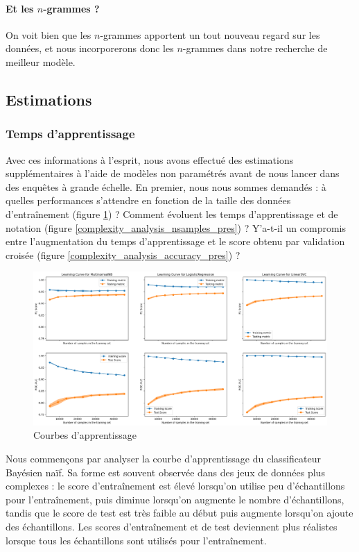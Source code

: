 \documentclass{article}
\begin{document}
\paragraph{Et les $n$-grammes ?}

On voit bien que les $n$-grammes apportent un tout nouveau regard sur les données, et nous incorporerons donc les $n$-grammes dans notre recherche de meilleur modèle.

\subsection{Estimations}

\subsubsection{Temps d'apprentissage}
Avec ces informations à l'esprit, nous avons effectué des estimations supplémentaires à l'aide de modèles non paramétrés avant de nous lancer dans des enquêtes à grande échelle. En premier, nous nous sommes demandés : à quelles performances s'attendre en fonction de la taille des données d'entraînement (figure \ref{learningcurve_pres}) ? Comment évoluent les temps d'apprentissage et de notation (figure \ref{complexity_analysis_nsamples_pres}) ? Y'a-t-il un compromis entre l'augmentation du temps d'apprentissage et le score obtenu par validation croisée (figure \ref{complexity_analysis_accuracy_pres}) ?

\begin{figure}[H]
    \centering
    \includegraphics[width=\textwidth]{./src/locuteur/learningcurve.png} 
    \caption{Courbes d'apprentissage}
    \label{learningcurve_pres}
\end{figure}

Nous commençons par analyser la courbe d'apprentissage du classificateur Bayésien naïf. Sa forme est souvent observée dans des jeux de données plus complexes : le score d'entraînement est élevé lorsqu'on utilise peu d'échantillons pour l'entraînement, puis diminue lorsqu'on augmente le nombre d'échantillons, tandis que le score de test est très faible au début puis augmente lorsqu'on ajoute des échantillons. Les scores d'entraînement et de test deviennent plus réalistes lorsque tous les échantillons sont utilisés pour l'entraînement.
\end{document}
